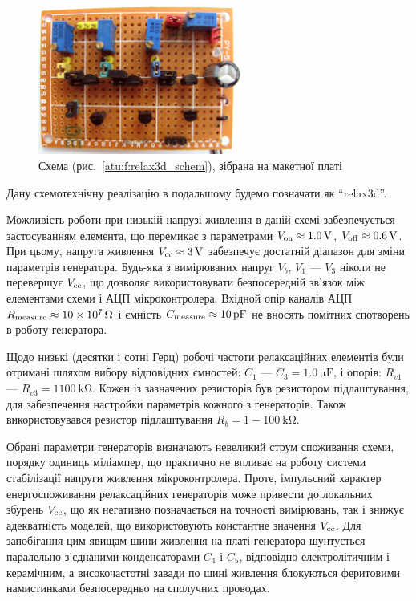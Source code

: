 \begin{figure}[htb!]
  \centerline{\includegraphics[width=0.6\textwidth]{p/relax3d_board.jpg} }
\caption{Схема (рис.~\ref{atu:f:relax3d_schem}), зібрана на макетної платі}
\label{atu:f:relax3d_board}
\end{figure}

Дану схемотехнічну реалізацію в подальшому будемо позначати
як ``relax3d''.


Можливість роботи при низькій напрузі живлення в даній
схемі забезпечується застосуванням елемента, що перемикає
з параметрами
$V _\mathrm{on} \approx \SI{1.0}{\volt} $,
$V _\mathrm{off} \approx \SI{0.6}{ \volt} $. При цьому, напруга живлення
$V _\mathrm{cc} \approx \SI{3}{\volt} $ забезпечує достатній діапазон для зміни
параметрів генератора. Будь-яка з вимірюваних напруг
$V_b $,
$V_1 $ ---
$V_3 $ ніколи не перевершує
$V _\mathrm{cc} $, що дозволяє використовувати безпосередній зв'язок між
елементами схеми і АЦП мікроконтролера. Вхідной опір каналів АЦП
$R _\mathrm{measure} \approx \SI{10e7}{\ohm} $ і ємність
$C \Tidx{measure} \approx \SI{10}{\pico \farad} $ не вносять помітних спотворень в
роботу генератора.

Щодо низькі (десятки і сотні Герц) робочі частоти релаксаційних
елементів були отримані шляхом вибору відповідних ємностей:
$C_1 $ --- $ C_3 = \SI{1.0}{\micro \farad} $, і опорів:
$R_{v1} $ --- $ R_{v3} = 1 \SI{100}{\kilo \ohm} $.
Кожен із зазначених резисторів був
резистором підлаштування, для забезпечення настройки параметрів кожного
з генераторів. Також використовувався
резистор підлаштування $ R_{b} = 1-\SI{100}{\kilo\ohm}$.

Обрані параметри генераторів визначають невеликий струм
споживання схеми, порядку одиниць міліампер, що практично
не впливає на роботу системи стабілізації напруги живлення
мікроконтролера. Проте, імпульсний характер енергоспоживання
релаксаційних генераторів може привести до локальних збурень
$V _\mathrm{cc}$, що як негативно позначається на точності вимірювань,
так і знижує адекватність моделей, що використовують константне
значення
$V _\mathrm{cc}$. Для запобігання цим явищам шини живлення на платі
генератора шунтується паралельно з'єднаними конденсаторами
$C_4$ і
$C_5$, відповідно електролітичним і керамічним, а високочастотні
завади по шині живлення блокуються феритовими намистинками
безпосередньо на сполучних проводах.


